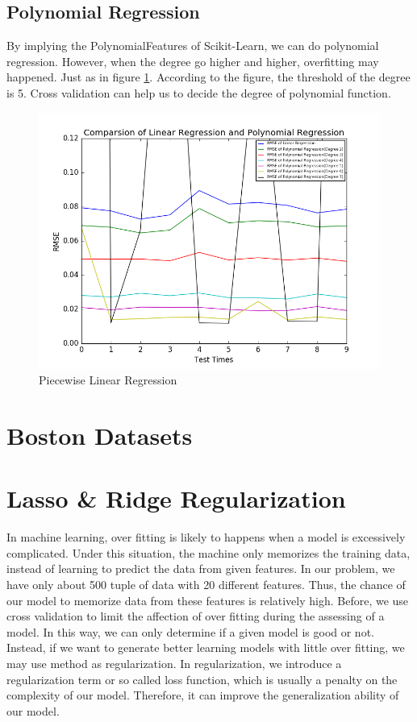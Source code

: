 \documentclass{article}
\begin{document}
\subsection{Polynomial Regression}
By implying the PolynomialFeatures of Scikit-Learn, we can do polynomial regression. However, when the degree go higher and higher, overfitting may happened. Just as in figure \ref{fig:pr1}. According to the figure, the threshold of the degree is 5. Cross validation can help us to decide the degree of polynomial function.
\begin{figure}[htbp]
\centering
\includegraphics[width=.6\textwidth]{pr1.png}
\caption{Piecewise Linear Regression}
\label{fig:pr1}
\end{figure}
\section{Boston Datasets}
\section{Lasso \& Ridge Regularization}
In machine learning, over fitting is likely to happens when a model is excessively complicated. Under this situation, the machine only memorizes the training data, instead of learning to predict the data from given features. In our problem, we have only about 500 tuple of data with 20 different features. Thus, the chance of our model to memorize data from these features is relatively high.
Before, we use cross validation to limit the affection of over fitting during the assessing of a model. In this way, we can only determine if a given model is good or not. Instead, if we want to generate better learning models with little over fitting, we may use method as regularization.
In regularization, we introduce a regularization term or so called loss function, which is usually a penalty on the complexity of our model. Therefore, it can improve the generalization ability of our model.
\end{document}
